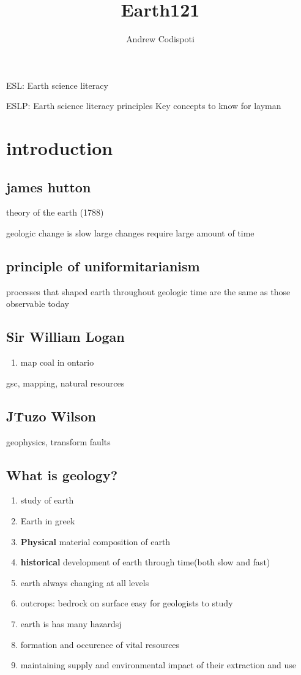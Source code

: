 \documentclass[11pt]{amsart}
\title{Earth121}
\author{Andrew Codispoti}
\begin{document}
\maketitle
\par ESL: Earth science literacy
\par ESLP: Earth science literacy principles Key concepts to know for layman
\section{introduction}
\subsection{james hutton}
\par theory of the earth (1788)
\par geologic change is slow large changes require large amount of time
\subsection{principle of uniformitarianism}
\par processes that shaped earth throughout geologic time are the same as those observable today
\subsection{Sir William Logan}
\begin{enumerate}
  \item map coal in ontario
\end{enumerate}
\par gsc, mapping, natural resources
\subsection{J\. Tuzo Wilson}
\par geophysics, transform faults
\subsection{What is geology?}
\begin{enumerate}
  \item study of earth
  \item Earth in greek
  \item \textbf{Physical} material composition of earth
  \item \textbf{historical} development of earth through time(both slow and
    fast)
  \item earth always changing at all levels
  \item outcrops: bedrock on surface {easy for geologists to study}
  \item earth is has many hazardsj
  \item formation and occurence of vital resources
  \item maintaining supply and environmental impact of their extraction and use
\end{enumerate}
\end{document}
